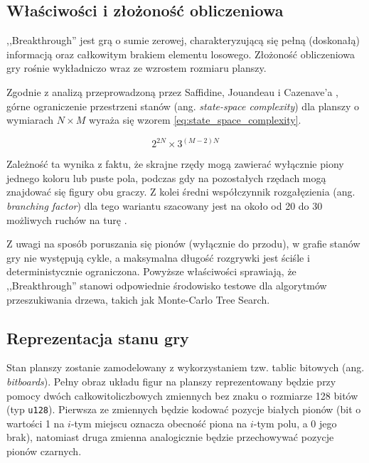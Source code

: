 \documentclass{article}
\begin{document}
\subsection{Właściwości i złożoność obliczeniowa}

,,Breakthrough'' jest grą o sumie zerowej, charakteryzującą się pełną (doskonałą) informacją oraz całkowitym brakiem elementu losowego. Złożoność obliczeniowa gry rośnie wykładniczo wraz ze wzrostem rozmiaru planszy.

Zgodnie z analizą przeprowadzoną przez Saffidine, Jouandeau i Cazenave'a \cite{saffidine2012solving}, górne ograniczenie przestrzeni stanów (ang. \textit{state-space complexity}) dla planszy o wymiarach $N \times M$ wyraża się wzorem \ref{eq:state_space_complexity}. 

\begin{equation}
    2^{2N} \times 3^{(M-2)N}
    \label{eq:state_space_complexity}
\end{equation}

\noindent
Zależność ta wynika z faktu, że skrajne rzędy mogą zawierać wyłącznie piony jednego koloru lub puste pola, podczas gdy na pozostałych rzędach mogą znajdować się figury obu graczy. Z kolei średni współczynnik rozgałęzienia (ang. \textit{branching factor}) dla tego wariantu szacowany jest na około od 20 do 30 możliwych ruchów na turę \cite{saffidine2012solving}. 

Z uwagi na sposób poruszania się pionów (wyłącznie do przodu), w grafie stanów gry nie występują cykle, a maksymalna długość rozgrywki jest ściśle i deterministycznie ograniczona. Powyższe właściwości sprawiają, że ,,Breakthrough'' stanowi odpowiednie środowisko testowe dla algorytmów przeszukiwania drzewa, takich jak Monte-Carlo Tree Search.

\subsection{Reprezentacja stanu gry} 

Stan planszy zostanie zamodelowany z wykorzystaniem tzw. tablic bitowych (ang. \textit{bitboards}). Pełny obraz układu figur na planszy reprezentowany będzie przy pomocy dwóch całkowitoliczbowych zmiennych bez znaku o rozmiarze 128 bitów (typ \texttt{u128}). Pierwsza ze zmiennych będzie kodować pozycje białych pionów (bit o wartości 1 na $i$-tym miejscu oznacza obecność piona na $i$-tym polu, a 0 jego brak), natomiast druga zmienna analogicznie będzie przechowywać pozycje pionów czarnych.
\end{document}
